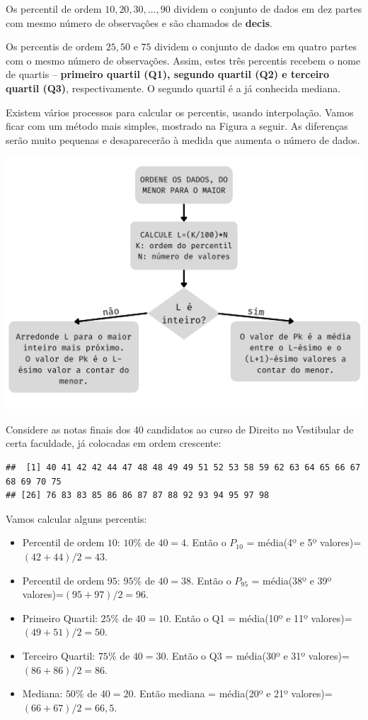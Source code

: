 \documentclass[
]{book}
\begin{document}
Os percentil de ordem \(10,20,30,\ldots,90\) dividem o conjunto de dados em dez partes com mesmo número de observações e são chamados de \textbf{decis}.

Os percentis de ordem \(25,50\) e \(75\) dividem o conjunto de dados em quatro partes com o mesmo número de observações. Assim, estes três percentis recebem o nome de quartis -- \textbf{primeiro quartil (Q1), segundo quartil (Q2) e terceiro quartil (Q3)}, respectivamente. O segundo quartil é a já conhecida mediana.

Existem vários processos para calcular os percentis, usando interpolação. Vamos ficar com um método mais simples, mostrado na Figura a seguir. As diferenças serão muito pequenas e desaparecerão à medida que aumenta o número de dados.

\includegraphics{fluxograma_percentil.png}

Considere as notas finais dos 40 candidatos ao curso de Direito no Vestibular de certa faculdade, já colocadas em ordem crescente:

\begin{verbatim}
##  [1] 40 41 42 42 44 47 48 48 49 49 51 52 53 58 59 62 63 64 65 66 67 68 69 70 75
## [26] 76 83 83 85 86 86 87 87 88 92 93 94 95 97 98
\end{verbatim}

Vamos calcular alguns percentis:

\begin{itemize}
\item
  Percentil de ordem \(10\): \(10\%\) de \(40=4\). Então o \(P_10\) = média(4º e 5º valores)=\((42+44)/2=43\).
\item
  Percentil de ordem \(95\): \(95\%\) de \(40=38\). Então o \(P_95\) = média(38º e 39º valores)=\((95+97)/2=96\).
\item
  Primeiro Quartil: \(25\%\) de \(40=10\). Então o Q1 = média(10º e 11º valores)=\((49+51)/2 = 50\).
\item
  Terceiro Quartil: \(75\%\) de \(40=30\). Então o Q3 = média(30º e 31º valores)=\((86+86)/2 = 86\).
\item
  Mediana: \(50\%\) de \(40=20\). Então mediana = média(20º e 21º valores)=\((66+67)/2 = 66,5\).
\end{itemize}
\end{document}
